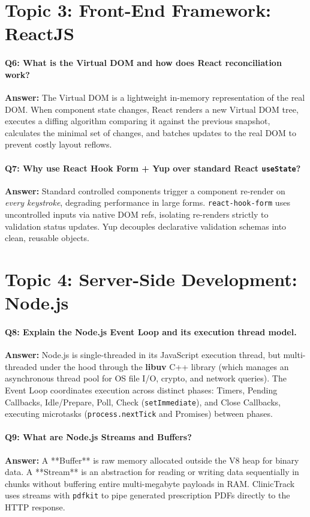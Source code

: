 \documentclass[12pt,a4paper,oneside]{report}
\begin{document}
\section{Topic 3: Front-End Framework: ReactJS}
\paragraph{Q6: What is the Virtual DOM and how does React reconciliation work?}
\textbf{Answer:} The Virtual DOM is a lightweight in-memory representation of the real DOM. When component state changes, React renders a new Virtual DOM tree, executes a diffing algorithm comparing it against the previous snapshot, calculates the minimal set of changes, and batches updates to the real DOM to prevent costly layout reflows.

\paragraph{Q7: Why use React Hook Form + Yup over standard React \texttt{useState}?}
\textbf{Answer:} Standard controlled components trigger a component re-render on \textit{every keystroke}, degrading performance in large forms. \texttt{react-hook-form} uses uncontrolled inputs via native DOM refs, isolating re-renders strictly to validation status updates. Yup decouples declarative validation schemas into clean, reusable objects.

\section{Topic 4: Server-Side Development: Node.js}
\paragraph{Q8: Explain the Node.js Event Loop and its execution thread model.}
\textbf{Answer:} Node.js is single-threaded in its JavaScript execution thread, but multi-threaded under the hood through the \textbf{libuv} C++ library (which manages an asynchronous thread pool for OS file I/O, crypto, and network queries). The Event Loop coordinates execution across distinct phases: Timers, Pending Callbacks, Idle/Prepare, Poll, Check (\texttt{setImmediate}), and Close Callbacks, executing microtasks (\texttt{process.nextTick} and Promises) between phases.

\paragraph{Q9: What are Node.js Streams and Buffers?}
\textbf{Answer:} A **Buffer** is raw memory allocated outside the V8 heap for binary data. A **Stream** is an abstraction for reading or writing data sequentially in chunks without buffering entire multi-megabyte payloads in RAM. ClinicTrack uses streams with \texttt{pdfkit} to pipe generated prescription PDFs directly to the HTTP response.
\end{document}
